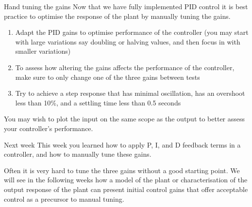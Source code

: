 \documentclass[9pt]{beamer-control}
\begin{document}

\begin{frame}{Hand tuning the gains}
Now that we have fully implemented PID control it is best practice to optimise the response of the plant by manually tuning the gains. 

\begin{enumerate}
	\item Adapt the PID gains to optimise performance of the controller (you may start with large variations say doubling or halving values, and then focus in with smaller variations)
	\item To assess how altering the gains affects the performance of the controller, make sure to only change one of the three gains between tests
	\item Try to achieve a step response that has minimal oscillation, has an overshoot less than 10\%, and a settling time less than 0.5 seconds
\end{enumerate}
You may wish to plot the input on the same scope as the output to better assess your controller's performance.

\end{frame}

\begin{frame}{Next week}
This week you learned how to apply P, I, and D feedback terms in a controller, and how to manually tune these gains.

Often it is very hard to tune the three gains without a good starting point. We will see in the following weeks how a model of the plant or characterisation of the output response of the plant can present initial control gains that offer acceptable control as a precursor to manual tuning. 
\end{frame}
\end{document}
